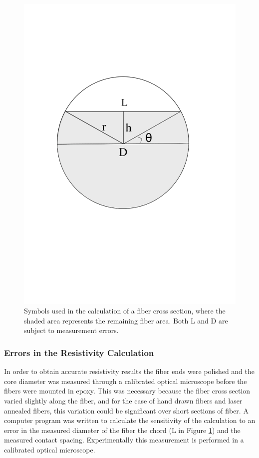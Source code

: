 \begin{figure}
    \centering
    \includegraphics[width=.7\textwidth]{fig/polishing/fiberdiagram.jpg}
    \caption{Symbols used in the calculation of a fiber cross section, where the shaded area represents the remaining fiber area. Both L and D are subject to measurement errors.}
    \label{fig:fiber}
\end{figure}
\subsubsection{Errors in the Resistivity Calculation}
In order to obtain accurate resistivity results the fiber ends were polished and the core diameter was measured through a calibrated optical microscope before the fibers were mounted in epoxy. This was necessary because the 
fiber cross section varied slightly along the fiber, and for the case of hand drawn fibers and laser annealed fibers, this variation could be significant over short sections of fiber.  A computer program was written to calculate the sensitivity of the calculation to an error in the measured diameter of the fiber the chord (L in Figure \ref{fig:fiber}) and the measured contact spacing. Experimentally this measurement is performed in a calibrated optical microscope. 

  
    \FloatBarrier
